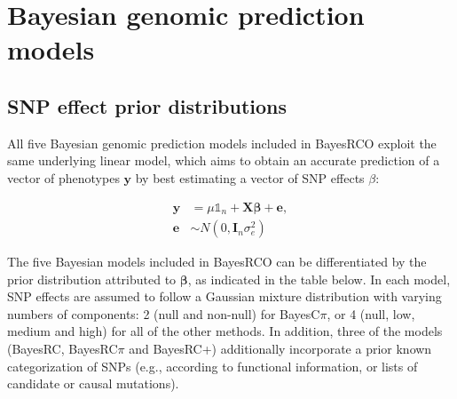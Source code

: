 \documentclass{ol-softwaremanual}
\begin{document}
\section{Bayesian genomic prediction models}

\subsection{SNP effect prior distributions}

All five Bayesian genomic prediction models included in BayesRCO exploit the same underlying linear model, which aims to obtain an accurate prediction of a vector of phenotypes $\mathbf{y}$ by best estimating a vector of SNP effects $\beta$: 

\begin{align*}
\mathbf{y}&=\mu \mathds{1}_n+\mathbf{X}\boldsymbol{\beta}+{\mathbf{e}}, \\
{\mathbf{e}} &\sim N(0,\mathbf{I}_n\sigma^2_e) \nonumber
\end{align*}

\noindent The five Bayesian models included in BayesRCO can be differentiated by the prior distribution attributed to $\boldsymbol{\beta}$, as indicated in the table below. In each model, SNP effects are assumed to follow a Gaussian mixture distribution with varying numbers of components: 2 (null and non-null) for BayesC$\pi$, or 4 (null, low, medium and high) for all of the other methods. In addition, three of the models (BayesRC, BayesRC$\pi$ and BayesRC+) additionally incorporate a prior known categorization of SNPs (e.g., according to functional information, or lists of candidate or causal mutations).
\end{document}
